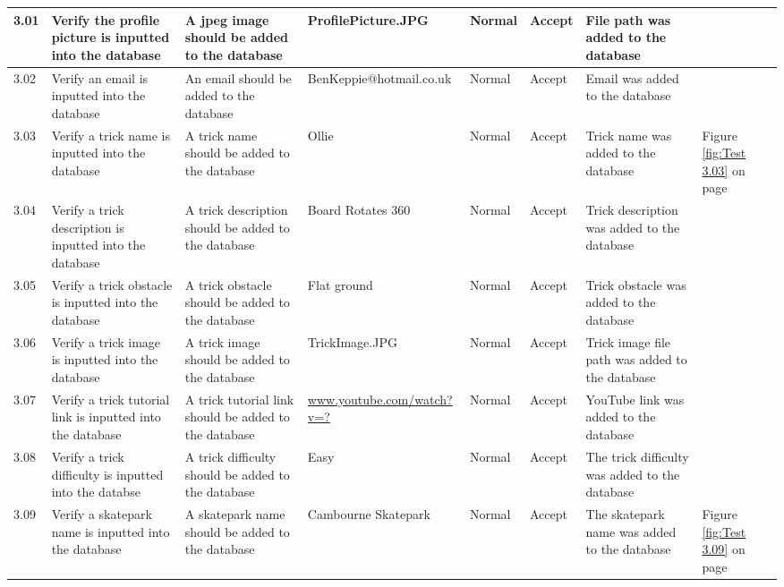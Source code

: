\begin{landscape}
\begin{center}
\begin{longtable}{|p{1.5cm}|p{2.5cm}|p{2.5cm}|p{2cm}|p{2cm}|p{2cm}|p{2cm}|p{2cm}|}
3.01 & Verify the profile picture is inputted into the database & A jpeg image should be added to the database & ProfilePicture.JPG & Normal & Accept & File path was added to the database & \\ \hline

3.02 & Verify an email is inputted into the database & An email should be added to the database & BenKeppie@hotmail.co.uk & Normal & Accept  & Email was added to the database & \\ \hline

3.03 & Verify a trick name is inputted into the database & A trick name should be added to the database & Ollie & Normal & Accept & Trick name was added to the database & Figure \ref{fig:Test 3.03} on page \pageref{fig:Test 3.03} \\ \hline

3.04 & Verify a trick description is inputted into the database & A trick description should be added to the database & Board Rotates 360 & Normal & Accept & Trick description was added to the database & \\ \hline

3.05  & Verify a trick obstacle is inputted into the database & A trick obstacle should be added to the database & Flat ground & Normal & Accept & Trick obstacle was added to the database & \\ \hline

3.06 & Verify a trick image is inputted into the database & A trick image should be added to the database & TrickImage.JPG & Normal & Accept & Trick image file path was added to the database& \\ \hline

3.07 & Verify a trick tutorial link is inputted into the database & A trick tutorial link should be added to the database & \url{www.youtube.com/watch?v=?} & Normal & Accept & YouTube link was added to the database & \\ \hline

3.08 & Verify a trick difficulty is inputted into the databse & A trick difficulty should be added to the database & Easy & Normal & Accept & The trick difficulty was added to the database & \\ \hline

3.09 & Verify a skatepark name is inputted into the database & A skatepark name should be added to the database & Cambourne Skatepark & Normal & Accept & The skatepark name was added to the database & Figure \ref{fig:Test 3.09} on page \pageref{fig:Test 3.09} \\ \hline


\end{longtable}
\end{center}
\end{landscape}

